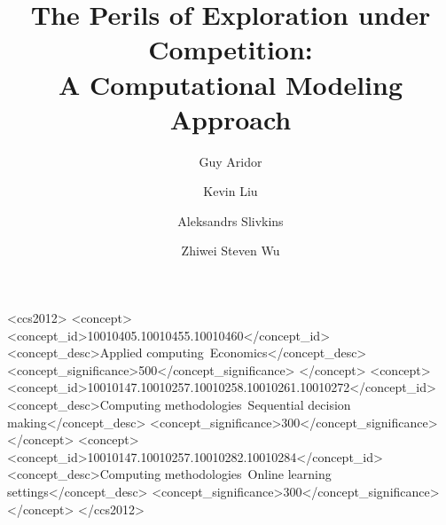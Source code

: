 \documentclass[acmsmall]{ec19acm}
\theoremstyle{definition}
\begin{document}
\title[The Perils of Exploration under Competition: A Computational Modeling Approach]
{The Perils of Exploration under Competition: \\ A Computational Modeling Approach}


 \author{Guy Aridor}
 \author{Kevin Liu}
 \author{Aleksandrs Slivkins}
 \author{Zhiwei Steven Wu}




 \begin{CCSXML}
<ccs2012>
<concept>
<concept_id>10010405.10010455.10010460</concept_id>
<concept_desc>Applied computing~Economics</concept_desc>
<concept_significance>500</concept_significance>
</concept>
<concept>
<concept_id>10010147.10010257.10010258.10010261.10010272</concept_id>
<concept_desc>Computing methodologies~Sequential decision making</concept_desc>
<concept_significance>300</concept_significance>
</concept>
<concept>
<concept_id>10010147.10010257.10010282.10010284</concept_id>
<concept_desc>Computing methodologies~Online learning settings</concept_desc>
<concept_significance>300</concept_significance>
</concept>
</ccs2012>
\end{CCSXML}


\fancyhead{}
%
%
\maketitle
\end{document}
